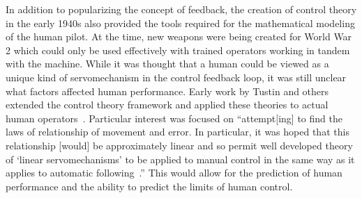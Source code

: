 \documentclass[float=false, crop=false]{standalone}
\begin{document}
In addition to popularizing the concept of feedback, the creation of control theory in the early 1940s also provided the tools required for the mathematical modeling of the human pilot.
At the time, new weapons were being created for World War 2 which could only be used effectively with trained operators working in tandem with the machine.
While it was thought that a human could be viewed as a unique kind of servomechanism in the control feedback loop, it was still unclear what factors affected human performance.
Early work by Tustin and others extended the control theory framework and applied these theories to actual human operators~\cite{tustininvestigation}.
Particular interest was focused on ``attempt[ing] to find the laws of relationship of movement and error. In particular, it was hoped that this relationship [would] be approximately linear and so permit well developed theory of `linear servomechanisms' to be applied to manual control in the same way as it applies to automatic following~\cite{tustininvestigation}.''
This would allow for the prediction of human performance and the ability to predict the limits of human control.
\end{document}
